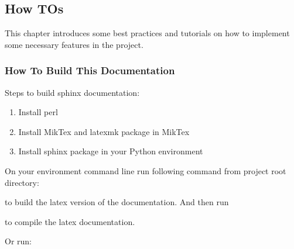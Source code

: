 \documentclass[letterpaper,10pt,english]{sphinxmanual}
\begin{document}
\subsection{How TOs}
\label{\detokenize{howto:how-tos}}\label{\detokenize{howto::doc}}
This chapter introduces some best practices and tutorials on how to implement some necessary features in the project.


\subsubsection{How To Build This Documentation}
\label{\detokenize{howto:how-to-build-this-documentation}}
Steps to build sphinx documentation:
\begin{enumerate}
%
\item {} 
Install perl

\item {} 
Install MikTex and latexmk package in MikTex

\item {} 
Install sphinx package in your Python environment

\end{enumerate}

On your environment command line run following command from project root directory:

\begin{sphinxVerbatim}[commandchars=\\\{\}]
     \PYGZbs{} \PYGZbs{}\PYGZbs{}
\end{sphinxVerbatim}

to build the latex version of the documentation. And then run

\begin{sphinxVerbatim}[commandchars=\\\{\}]
 \PYGZbs{}\PYGZbs{}  
\end{sphinxVerbatim}

to compile the latex documentation.

Or run:

\begin{sphinxVerbatim}[commandchars=\\\{\}]
     \PYGZbs{} \PYGZbs{}\PYGZbs{}
\end{sphinxVerbatim}
\end{document}
